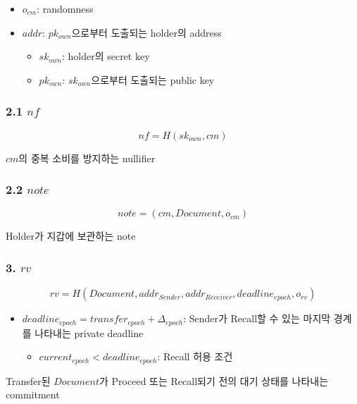 \documentclass[11pt,a4paper]{extarticle}
\begin{document}
\begin{itemize}
  \item \(o_{cm}\):
        randomness

  \item \(addr\):
        \(pk_{own}\)으로부터 도출되는 holder의 address

        \begin{itemize}
          \item \(sk_{own}\):
                holder의 secret key

          \item \(pk_{own}\):
                \(sk_{own}\)으로부터 도출되는 public key
        \end{itemize}
\end{itemize}

\subsubsection*{2.1 \(nf\)}

\[
  nf=H(sk_{own},cm)
\]

\(cm\)의 중복 소비를 방지하는 nullifier

\subsubsection*{2.2 \(note\)}

\[
  note=(cm,\mathit{Document},o_{cm})
\]

Holder가 지갑에 보관하는 note

\subsubsection*{3. \(rv\)}


\[
  rv
  =
  H(
  \mathit{Document},
  addr_{Sender},
  addr_{Receiver},
  deadline_{epoch},
  o_{rv}
  )
\]

\begin{itemize}
  \item \(deadline_{epoch}=transfer_{epoch}+\Delta_{epoch}\):
        Sender가 Recall할 수 있는 마지막 경계를 나타내는 private deadline
        \begin{itemize}
          \item \(current_{epoch}<deadline_{epoch}\):
                Recall 허용 조건
        \end{itemize}
\end{itemize}

Transfer된 \(\mathit{Document}\)가 Proceed 또는 Recall되기 전의 대기 상태를 나타내는 commitment
\end{document}
